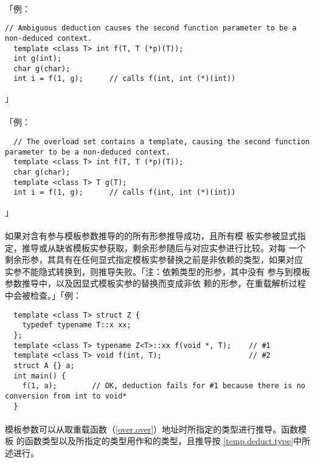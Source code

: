 \paragraph{}
「例：
\begin{lstlisting}
// Ambiguous deduction causes the second function parameter to be a non-deduced context.
  template <class T> int f(T, T (*p)(T));
  int g(int);
  char g(char);
  int i = f(1, g);      // calls f(int, int (*)(int))
\end{lstlisting}」

\paragraph{}
「例：
\begin{lstlisting}
  // The overload set contains a template, causing the second function parameter to be a non-deduced context.
  template <class T> int f(T, T (*p)(T));
  char g(char);
  template <class T> T g(T);
  int i = f(1, g);      // calls f(int, int (*)(int))
\end{lstlisting}」

\paragraph{}
如果对含有参与模板参数推导的的所有形参推导成功，且所有模
板实参被显式指定，推导或从缺省模板实参获取，剩余形参随后与对应实参进行比较。对每
一个剩余形参，其具有在任何显式指定模板实参替换之前是非依赖的类型，如果对应
实参不能隐式转换到，则推导失败。「注：依赖类型的形参，其中没有
参与到模板参数推导中，以及因显式模板实参的替换而变成非依
赖的形参，在重载解析过程中会被检查。」「例：
\begin{lstlisting}
  template <class T> struct Z {
    typedef typename T::x xx;
  };
  template <class T> typename Z<T>::xx f(void *, T);    // #1
  template <class T> void f(int, T);                    // #2
  struct A {} a;
  int main() {
    f(1, a);        // OK, deduction fails for #1 because there is no conversion from int to void*
  }
\end{lstlisting}

\paragraph{}
模板参数可以从取重载函数（\ref{over.over}）地址时所指定的类型进行推导。函数模板
的函数类型以及所指定的类型用作和的类型，且推导按
\ref{temp.deduct.type}中所述进行。

